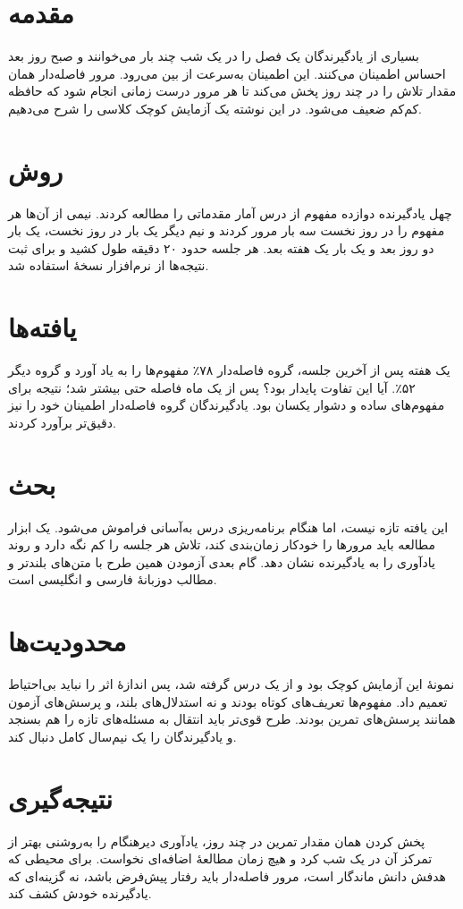 \documentclass[11pt,twocolumn]{article}
\begin{document}
\section*{مقدمه}
بسیاری از یادگیرندگان یک فصل را در یک شب چند بار می‌خوانند و صبح روز بعد احساس اطمینان می‌کنند. این اطمینان به‌سرعت از بین می‌رود. مرور فاصله‌دار همان مقدار تلاش را در چند روز پخش می‌کند تا هر مرور درست زمانی انجام شود که حافظه کم‌کم ضعیف می‌شود. در این نوشته یک آزمایش کوچک کلاسی را شرح می‌دهیم.

\section*{روش}
چهل یادگیرنده دوازده مفهوم از درس آمار مقدماتی را مطالعه کردند. نیمی از آن‌ها هر مفهوم را در روز نخست سه بار مرور کردند و نیم دیگر یک بار در روز نخست، یک بار دو روز بعد و یک بار یک هفته بعد. هر جلسه حدود ۲۰ دقیقه طول کشید و برای ثبت نتیجه‌ها از نرم‌افزار  نسخهٔ  استفاده شد.

\section*{یافته‌ها}
یک هفته پس از آخرین جلسه، گروه فاصله‌دار ۷۸٪ مفهوم‌ها را به یاد آورد و گروه دیگر ۵۲٪. آیا این تفاوت پایدار بود؟ پس از یک ماه فاصله حتی بیشتر شد؛ نتیجه برای مفهوم‌های ساده و دشوار یکسان بود. یادگیرندگان گروه فاصله‌دار اطمینان خود را نیز دقیق‌تر برآورد کردند.

\section*{بحث}
این یافته تازه نیست، اما هنگام برنامه‌ریزی درس به‌آسانی فراموش می‌شود. یک ابزار مطالعه باید مرورها را خودکار زمان‌بندی کند، تلاش هر جلسه را کم نگه دارد و روند یادآوری را به یادگیرنده نشان دهد. گام بعدی آزمودن همین طرح با متن‌های بلندتر و مطالب دوزبانهٔ فارسی و انگلیسی است.

\section*{محدودیت‌ها}
نمونهٔ این آزمایش کوچک بود و از یک درس گرفته شد، پس اندازهٔ اثر را نباید بی‌احتیاط تعمیم داد. مفهوم‌ها تعریف‌های کوتاه بودند و نه استدلال‌های بلند، و پرسش‌های آزمون همانند پرسش‌های تمرین بودند. طرح قوی‌تر باید انتقال به مسئله‌های تازه را هم بسنجد و یادگیرندگان را یک نیم‌سال کامل دنبال کند.

\section*{نتیجه‌گیری}
پخش کردن همان مقدار تمرین در چند روز، یادآوری دیرهنگام را به‌روشنی بهتر از تمرکز آن در یک شب کرد و هیچ زمان مطالعهٔ اضافه‌ای نخواست. برای محیطی که هدفش دانش ماندگار است، مرور فاصله‌دار باید رفتار پیش‌فرض باشد، نه گزینه‌ای که یادگیرنده خودش کشف کند.
\end{document}
